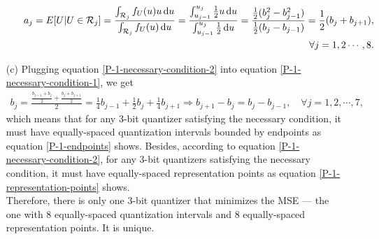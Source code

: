 \documentclass{assignment}
\begin{document}
\begin{sol}
\begin{itemize}
\begin{itemize}
            \begin{align}
                \label{P-1-necessary-condition-2}
                \notag a_j=E[U\vert U\in\mathcal{R}_j]=\frac{\int_{\mathcal{R}_j}f_U(u)u\,\mathrm{d}u}{\int_{\mathcal{R}_j}f_U(u)\,\mathrm{d}u}=\frac{\int_{u_{j-1}}^{u_j}\frac{1}{2}u\,\mathrm{d}u}{\int_{u_{j-1}}^{u_j}\frac{1}{2}\,\mathrm{d}u}=\frac{\frac{1}{2}(b_j^2-b_{j-1}^2)}{\frac{1}{2}(b_j-b_{j-1})}=\frac{1}{2}(b_j+b_{j+1}),\\
                \forall j=1,2\cdots,8.
            \end{align}
        \end{itemize}
        \item[(c)] Plugging equation \eqref{P-1-necessary-condition-2} into equation \eqref{P-1-necessary-condition-1}, we get
        \begin{align}
            b_j=\frac{\frac{b_{j-1}+b_j}{2}+\frac{b_j+b_{j+1}}{2}}{2}=\frac{1}{4}b_{j-1}+\frac{1}{2}b_j+\frac{1}{4}b_{j+1}\Longrightarrow b_{j+1}-b_j=b_j-b_{j-1},\quad\forall j=1,2,\cdots,7,
        \end{align}
        which means that for any $3$-bit quantizer satisfying the necessary condition, it must have equally-spaced quantization intervals bounded by endpoints as equation \eqref{P-1-endpoints} shows. Besides, according to equation \eqref{P-1-necessary-condition-2}, for any $3$-bit quantizers satisfying the necessary condition, it must have equally-spaced representation points as equation \eqref{P-1-representation-points} shows.\\
        Therefore, there is only one $3$-bit quantizer that minimizes the MSE --- the one with $8$ equally-spaced quantization intervals and $8$ equally-spaced representation points. It is unique.
    \end{itemize}
\end{sol}
\end{document}
